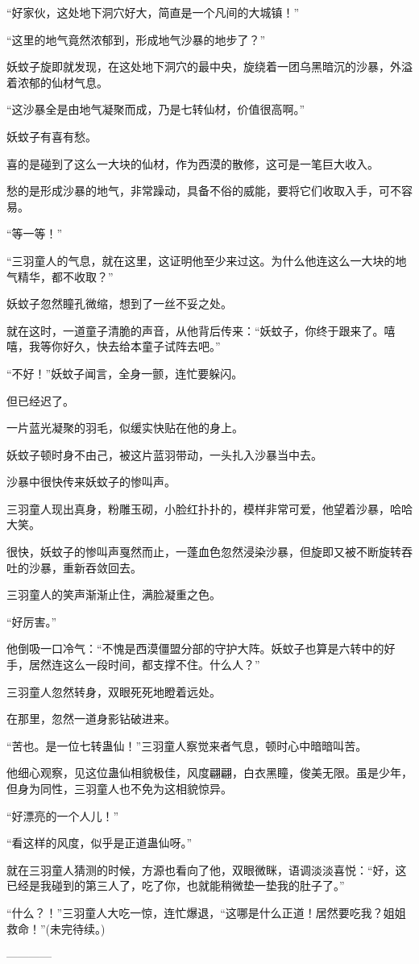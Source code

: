 \begin{this_body}
“好家伙，这处地下洞穴好大，简直是一个凡间的大城镇！”

“这里的地气竟然浓郁到，形成地气沙暴的地步了？”

妖蚊子旋即就发现，在这处地下洞穴的最中央，旋绕着一团乌黑暗沉的沙暴，外溢着浓郁的仙材气息。

“这沙暴全是由地气凝聚而成，乃是七转仙材，价值很高啊。”

妖蚊子有喜有愁。

喜的是碰到了这么一大块的仙材，作为西漠的散修，这可是一笔巨大收入。

愁的是形成沙暴的地气，非常躁动，具备不俗的威能，要将它们收取入手，可不容易。

“等一等！”

“三羽童人的气息，就在这里，这证明他至少来过这。为什么他连这么一大块的地气精华，都不收取？”

妖蚊子忽然瞳孔微缩，想到了一丝不妥之处。

就在这时，一道童子清脆的声音，从他背后传来：“妖蚊子，你终于跟来了。嘻嘻，我等你好久，快去给本童子试阵去吧。”

“不好！”妖蚊子闻言，全身一颤，连忙要躲闪。

但已经迟了。

一片蓝光凝聚的羽毛，似缓实快贴在他的身上。

妖蚊子顿时身不由己，被这片蓝羽带动，一头扎入沙暴当中去。

沙暴中很快传来妖蚊子的惨叫声。

三羽童人现出真身，粉雕玉砌，小脸红扑扑的，模样非常可爱，他望着沙暴，哈哈大笑。

很快，妖蚊子的惨叫声戛然而止，一蓬血色忽然浸染沙暴，但旋即又被不断旋转吞吐的沙暴，重新吞敛回去。

三羽童人的笑声渐渐止住，满脸凝重之色。

“好厉害。”

他倒吸一口冷气：“不愧是西漠僵盟分部的守护大阵。妖蚊子也算是六转中的好手，居然连这么一段时间，都支撑不住。什么人？”

三羽童人忽然转身，双眼死死地瞪着远处。

在那里，忽然一道身影钻破进来。

“苦也。是一位七转蛊仙！”三羽童人察觉来者气息，顿时心中暗暗叫苦。

他细心观察，见这位蛊仙相貌极佳，风度翩翩，白衣黑瞳，俊美无限。虽是少年，但身为同性，三羽童人也不免为这相貌惊异。

“好漂亮的一个人儿！”

“看这样的风度，似乎是正道蛊仙呀。”

就在三羽童人猜测的时候，方源也看向了他，双眼微眯，语调淡淡喜悦：“好，这已经是我碰到的第三人了，吃了你，也就能稍微垫一垫我的肚子了。”

“什么？！”三羽童人大吃一惊，连忙爆退，“这哪是什么正道！居然要吃我？姐姐救命！”(未完待续。)

------------

\end{this_body}

